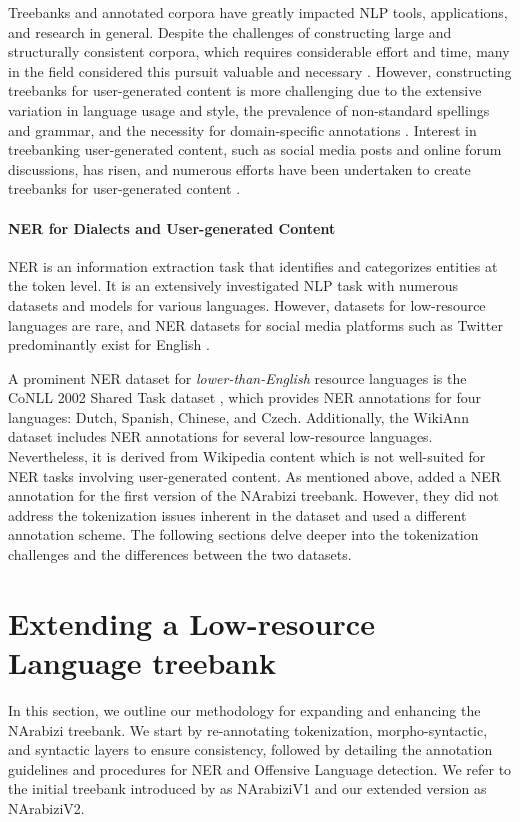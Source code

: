 \documentclass[11pt]{article}
\begin{document}
Treebanks and annotated corpora have greatly impacted NLP tools, applications, and research in general. Despite the challenges of constructing large and structurally consistent corpora, which requires considerable effort and time, many in the field considered this pursuit valuable and necessary \cite{de-marneffe-etal-2021-universal}. However, constructing treebanks for user-generated content is more challenging due to the extensive variation in language usage and style, the prevalence of non-standard spellings and grammar, and the necessity for domain-specific annotations \cite{sanguinetti2022treebanking}. Interest in treebanking user-generated content, such as social media posts and online forum discussions, has risen, and numerous efforts have been undertaken to create treebanks for user-generated content \cite{foster-etal-2011-news,seddah-etal-2012-french,sanguinetti-etal-2018-postwita,rehbein-etal-2019-tweede,sanguinetti-etal-2020-treebanking}.
\paragraph{NER for Dialects and User-generated Content}

NER is an information extraction task that identifies and categorizes entities at the token level. It is an extensively investigated NLP task with numerous datasets and models for various languages. However, datasets for low-resource languages are rare, and NER datasets for social media platforms such as Twitter predominantly exist for English \cite{ritter-etal-2011-named,derczynski-etal-2016-broad,derczynski-etal-2017-results}.

A prominent NER dataset for {\em lower-than-English} resource languages is the CoNLL 2002 Shared Task dataset \cite{tjong-kim-sang-2002-introduction}, which provides NER annotations for four languages: Dutch, Spanish, Chinese, and Czech. Additionally, the WikiAnn dataset \cite{pan-etal-2017-cross} includes NER annotations for several low-resource languages. Nevertheless, it is derived from Wikipedia content which is not well-suited for NER tasks involving user-generated content. As mentioned above, \citet{touileb2022nerdz} added a NER annotation for the first version of the NArabizi treebank. However, they did not address the tokenization issues inherent in the dataset and used a different annotation scheme. The following sections delve deeper into the tokenization challenges and the differences between the two datasets. 

\section{Extending a Low-resource Language treebank}
In this section, we outline our methodology for expanding and enhancing the NArabizi treebank. We start by re-annotating tokenization, morpho-syntactic, and syntactic layers to ensure consistency, followed by detailing the annotation guidelines and procedures for NER and Offensive Language detection. We refer to the initial treebank introduced by \citet{seddah-etal-2020-building} as NArabiziV1 and our extended version as NArabiziV2.
\end{document}
